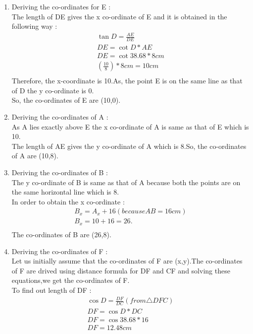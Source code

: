 \documentclass{article}
\begin{document}
\begin{enumerate}
\item Deriving the co-ordinates for E :\\
	The length of DE gives the x co-ordinate of E and it is obtained in the following way : \\
		\begin{align}
		\tan{D} = \frac{AE}{DE} \\
		DE = \cot{D} * AE\\
		DE = \cot{38.68} * 8cm\\
			(\frac{10}{8}) * 8cm = 10cm\\
		\end{align}
Therefore, the x-coordinate is 10.As, the point E is on the same line as that of D the y co-ordinate is 0.\\
So, the co-ordinates of E are (10,0).
\item Deriving the co-ordinates of A :\\
	As A lies exactly above E the x co-ordinate of A is same as that of E which is 10.\\
The length of AE gives the y co-ordinate of A which is 8.So, the co-ordinates of A are (10,8).
\item Deriving the co-ordinates of B : \\
	The y co-ordinate of B is same as that of A because both the points are on the same horizontal line which is 8.\\
In order to obtain the x co-ordinate :
		\begin{align}
			B_x = A_x + 16(because AB = 16cm)\\
			B_x = 10 +16 = 26.\\
		\end{align}
The co-ordinates of B are (26,8).\\
\item Deriving the co-ordinates of F :\\
Let us initially assume that the co-ordinates of F are (x,y).The co-ordinates of F are drived using distance formula for DF and CF and solving these equations,we get the co-ordinates of F.\\
To find out length of DF : \\
		\begin{align}
			\cos{D} = \frac{DF}{DC} (from \triangle{DFC})\\
			DF = \cos{D} * DC\\
			DF = \cos{38.68} * 16\\
			DF = 12.48cm\\

\end{align}
\end{enumerate}
\end{document}

